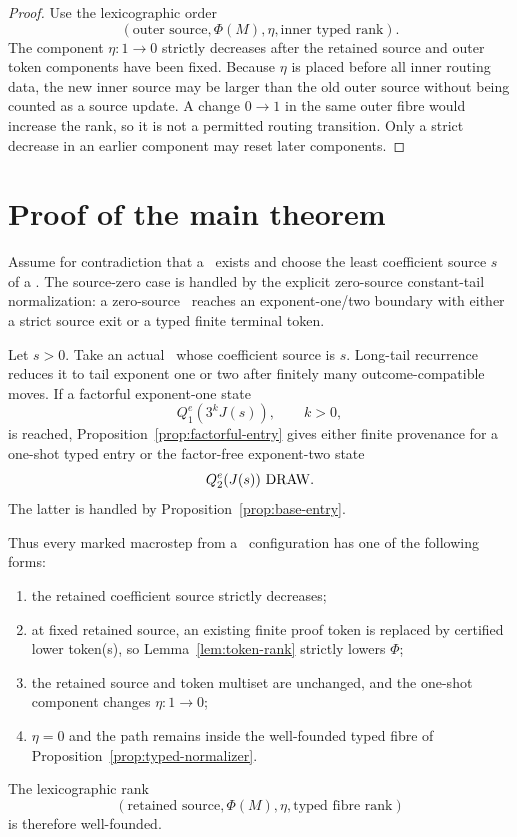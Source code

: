 \begin{proof}
Use the lexicographic order
\[
  (\text{outer source},\Phi(M),\eta,\text{inner typed rank}).
\]
The component $\eta:1\to0$ strictly decreases after the retained source and
outer token components have been fixed. Because $\eta$ is placed before all
inner routing data, the new inner source may be larger than the old outer source
without being counted as a source update. A change $0\to1$ in the same outer
fibre would increase the rank, so it is not a permitted routing transition.
Only a strict decrease in an earlier component may reset later components.
\end{proof}

\section{Proof of the main theorem}

Assume for contradiction that a \DRAW\ exists and choose the least coefficient
source $s$ of a \DRAW. The source-zero case is handled by the explicit
zero-source constant-tail normalization: a zero-source \DRAW\ reaches an
exponent-one/two boundary with either a strict source exit or a typed finite
terminal token.

Let $s>0$. Take an actual \DRAW\ whose coefficient source is $s$. Long-tail
recurrence reduces it to tail exponent one or two after finitely many
outcome-compatible moves. If a factorful exponent-one state
\[
  Q_1^e(3^kJ(s)),\qquad k>0,
\]
is reached, Proposition~\ref{prop:factorful-entry} gives either finite
provenance for a one-shot typed entry or the factor-free exponent-two state
\[
  Q_2^e(J(s))\text{ \ensuremath{\mathrm{DRAW}}}.
\]
The latter is handled by Proposition~\ref{prop:base-entry}.

Thus every marked macrostep from a \DRAW\ configuration has one of the following
forms:
\begin{enumerate}[label=(\roman*)]
\item the retained coefficient source strictly decreases;
\item at fixed retained source, an existing finite proof token is replaced by
      certified lower token(s), so Lemma~\ref{lem:token-rank} strictly lowers
      $\Phi$;
\item the retained source and token multiset are unchanged, and the one-shot
      component changes $\eta:1\to0$;
\item $\eta=0$ and the path remains inside the well-founded typed fibre of
      Proposition~\ref{prop:typed-normalizer}.
\end{enumerate}
The lexicographic rank
\[
  (\text{retained source},\Phi(M),\eta,\text{typed fibre rank})
\]
is therefore well-founded.

